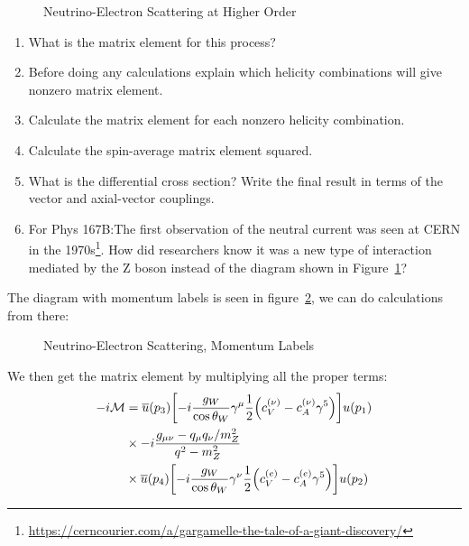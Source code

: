 \documentclass[12pt]{article}
\renewcommand{\l}{\ell}
\renewcommand{\bar}{\overline}
\newcommand{\M}{\mathcal{M}}
\numberwithin{equation}{section}
\begin{document}
\begin{problem}
\begin{figure}[H]
    \caption{Neutrino-Electron Scattering at Higher Order}\label{fig:t52}
  \end{figure}
  \begin{enumerate}
  \item What is the matrix element for this process?
  \item Before doing any calculations explain which helicity combinations will give nonzero matrix element.
  \item Calculate the matrix element for each nonzero helicity combination.
  \item Calculate the spin-average matrix element squared.
  \item What is the differential cross section? Write the final result in terms of the vector and axial-vector couplings.
  \item For Phys 167B:\@ The first observation of the neutral current was seen at CERN in the 1970s\footnote{ \url{https://cerncourier.com/a/gargamelle-the-tale-of-a-giant-discovery/}}. How did researchers know it was a new type of interaction mediated by the $\mathrm{Z}$ boson instead of the diagram shown in Figure~\ref{fig:t52}?
  \end{enumerate}
\end{problem}
The diagram with momentum labels is seen in figure~\ref{fig:t53}, we can do calculations from there:
\begin{figure}[H]
  \centering
  \caption{Neutrino-Electron Scattering, Momentum Labels}\label{fig:t53}
\end{figure}
We then get the matrix element by multiplying all the proper terms:
\begin{align*}
  -i\M&=\bar{u}(p_3)\qty[-i\frac{g_W}{\cos\theta_W}\gamma^\mu\frac12
  \qty(c_V^{(\nu)}-c_A^{(\nu)}\gamma^5)]u(p_1)\\
  &\times-i\frac{g_{\mu\nu}-q_\mu q_\nu/m_Z^2}{q^2-m^2_Z}\\
  &\times\bar{u}(p_4)\qty[-i\frac{g_W}{\cos\theta_W}\gamma^\nu\frac12
  \qty(c_V^{(e)}-c_A^{(e)}\gamma^5)]u(p_2)
\end{align*}
\end{document}
